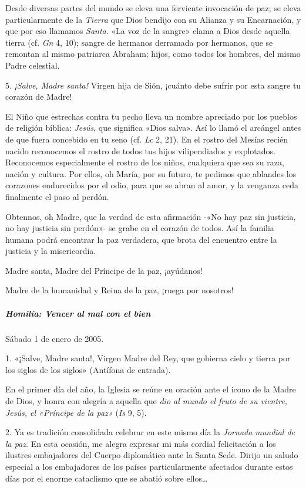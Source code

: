 \documentclass[]{article}
\let\oldsubparagraph\subparagraph
\renewcommand{\subparagraph}[1]{\oldsubparagraph{#1}\mbox{}}
\begin{document}
Desde diversas partes del mundo se eleva una ferviente invocación de
paz; se eleva particularmente de la \emph{Tierra} que Dios bendijo con
su Alianza y su Encarnación, y que por eso llamamos \emph{Santa}. «La
voz de la sangre» clama a Dios desde aquella tierra (cf. \emph{Gn} 4,
10); sangre de hermanos derramada por hermanos, que se remontan al mismo
patriarca Abraham; hijos, como todos los hombres, del mismo Padre
celestial.

5. \emph{¡Salve, Madre santa!} Virgen hija de Sión, ¡cuánto debe sufrir
por esta sangre tu corazón de Madre!

El Niño que estrechas contra tu pecho lleva un nombre apreciado por los
pueblos de religión bíblica: \emph{Jesús}, que significa «Dios salva».
Así lo llamó el arcángel antes de que fuera concebido en tu seno (cf.
\emph{Lc} 2, 21). En el rostro del Mesías recién nacido reconocemos el
rostro de todos tus hijos vilipendiados y explotados. Reconocemos
especialmente el rostro de los niños, cualquiera que sea su raza, nación
y cultura. Por ellos, oh María, por su futuro, te pedimos que ablandes
los corazones endurecidos por el odio, para que se abran al amor, y la
venganza ceda finalmente el paso al perdón.

Obtennos, oh Madre, que la verdad de esta afirmación -«No hay paz sin
justicia, no hay justicia sin perdón»- se grabe en el corazón de todos.
Así la familia humana podrá encontrar la paz verdadera, que brota del
encuentro entre la justicia y la misericordia.

Madre santa, Madre del Príncipe de la paz, ¡ayúdanos!

Madre de la humanidad y Reina de la paz, ¡ruega por nosotros!

\subparagraph{Homilía: Vencer al mal con el
bien}\label{homiluxeda-vencer-al-mal-con-el-bien}

Sábado 1 de enero de 2005.

1. «¡Salve, Madre santa!, Virgen Madre del Rey, que gobierna cielo y
tierra por los siglos de los siglos» (Antífona de entrada).

En el primer día del año, la Iglesia se reúne en oración ante el icono
de la Madre de Dios, y honra con alegría a aquella que \emph{dio al
mundo el fruto de su vientre, Jesús, el «Príncipe de la paz»} (\emph{Is}
9, 5).

2. Ya es tradición consolidada celebrar en este mismo día la
\emph{Jornada mundial de la paz}. En esta ocasión, me alegra expresar mi
más cordial felicitación a los ilustres embajadores del Cuerpo
diplomático ante la Santa Sede. Dirijo un saludo especial a los
embajadores de los países particularmente afectados durante estos días
por el enorme cataclismo que se abatió sobre ellos\ldots{}
\end{document}
